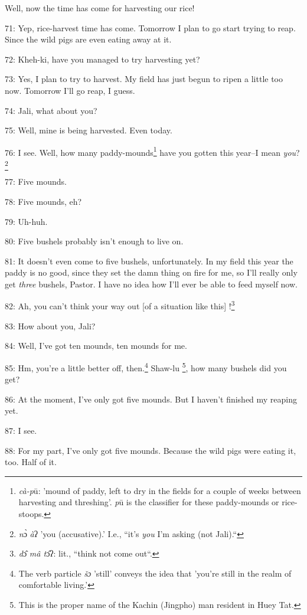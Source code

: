 \leftskip=0pt
Well, now the time has come for harvesting our rice!

71: Yep, rice-harvest time has come. Tomorrow I plan to go start trying to reap.
Since the wild pigs are even eating away at it.

72: Kheh-ki, have you managed to try harvesting yet?

73: Yes, I plan to try to harvest. My field has just begun to ripen a little too
now. Tomorrow I'll go reap, I guess.

74: Jali, what about you?

75: Well, mine is being harvested.  Even today.

76: I see. Well, how many paddy-mounds\footnote{\textit{cà-p}ū: 'mound of paddy, left to dry in the fields for a couple of weeks between harvesting and threshing'. \textit{p}ū is the classifier for these paddy-mounds or rice-stoops.}  have you gotten this year--I mean \emph{you}?\footnote{\textit{n}ɔ̀\textit{ à}ʔ 'you (accusative).' I.e., ``it's \textit{you} I'm asking (not Jali).``}

77: Five mounds.

78: Five mounds, eh?

79: Uh-huh.

80: Five bushels probably isn't enough to live on.

81: It doesn't even come to five bushels, unfortunately. In my field this year
the paddy is no good, since they set the damn thing on fire for me, so I'll really
only get \textit{three} bushels, Pastor. I have no idea how I'll ever be able to
feed myself now.

82: Ah, you can't think your way out [of a situation like this] !\footnote{\textit{d}ɔ̂\textit{ mâ t}ɔ̂ʔ: lit., ``think not come out``.}

83: How about you, Jali?

84: Well, I've got ten mounds, ten mounds for me.

85: Hm, you're a little better off, then.\footnote{The verb particle \textit{ š}\emph{ɔ} 'still' conveys the idea that 'you're still in the realm of comfortable living.'}  Shaw-lu  \footnote{This is the proper name of the Kachin (Jingpho) man resident in Huey Tat.}, how many bushels
did you get?

86: At the moment, I've only got five mounds. But I haven't finished my reaping
yet.

87: I see.

88: For my part, I've only got five mounds. Because the wild pigs were eating it,
too. Half of it.

